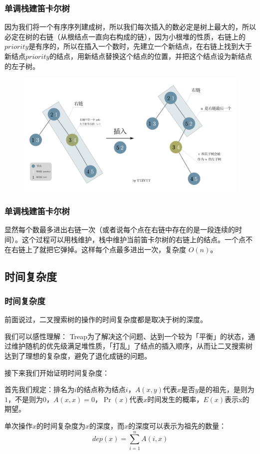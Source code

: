 \documentclass[utf8]{ctexbeamer}
\begin{document}
    \begin{frame}
        \frametitle{单调栈建笛卡尔树}
        因为我们将一个有序序列建成树，所以我们每次插入的数必定是树上最大的，所以必定在树的右链（从根结点一直向右构成的链），因为小根堆的性质，右链上的$priority$是有序的，所以在插入一个数时，先建立一个新结点，在右链上找到大于新结点$priority$的结点，用新结点替换这个结点的位置，并把这个结点设为新结点的左子树。
        \begin{figure}
            \includegraphics[width=\textwidth]{images/Treap_build.png}
        \end{figure}
    \end{frame}

    
    \begin{frame}
        \frametitle{单调栈建笛卡尔树}
        显然每个数最多进出右链一次（或者说每个点在右链中存在的是一段连续的时间）。这个过程可以用栈维护，栈中维护当前笛卡尔树的右链上的结点。一个点不在右链上了就把它弹掉。这样每个点最多进出一次，复杂度 $O(n)$。
    \end{frame}

    \subsection{时间复杂度}

    \begin{frame}
        \frametitle{时间复杂度}
        前面说过，二叉搜索树的操作的时间复杂度都是取决于树的深度。
        
        我们可以感性理解：
        Treap为了解决这个问题、达到一个较为「平衡」的状态，通过维护随机的优先级满足堆性质，「打乱」了结点的插入顺序，从而让二叉搜索树达到了理想的复杂度，避免了退化成链的问题。
        
        接下来我们开始证明时间复杂度：
        
        首先我们规定：排名为$i$的结点称为结点$i$，$A(x,y)$代表$x$是否$y$是的祖先，是则为$1$，不是则为$0$，$A(x,x)=0$，$\Pr(x)$代表$x$时间发生的概率，$E(x)$表示x的期望。

        单次操作$x$的时间复杂度为$x$的深度，而$x$的深度可以表示为祖先的数量：
        \[dep(x)=\sum_{i=1}^{n}A(i,x)\]
    \end{frame}
\end{document}

